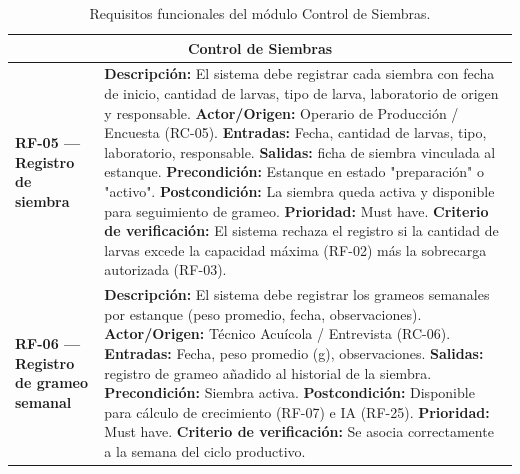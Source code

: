\documentclass[11pt,a4paper]{article}
\begin{document}
\begin{longtable}{|p{3.5cm}|p{12cm}|}

\caption{Requisitos funcionales del módulo Control de Siembras.}
\label{tab:rf-siembras} \\

\hline
\multicolumn{2}{|c|}{\textbf{Control de Siembras}} \\ 
\hline

\textbf{RF-05 — Registro de siembra} &
\textbf{Descripción:} El sistema debe registrar cada siembra con fecha de inicio, cantidad de larvas, tipo de larva, laboratorio de origen y responsable. \newline
\textbf{Actor/Origen:} Operario de Producción / Encuesta (RC-05). \newline
\textbf{Entradas:} Fecha, cantidad de larvas, tipo, laboratorio, responsable. \newline
\textbf{Salidas:} ficha de siembra vinculada al estanque. \newline
\textbf{Precondición:} Estanque en estado "preparación" o "activo". \newline
\textbf{Postcondición:} La siembra queda activa y disponible para seguimiento de grameo. \newline
\textbf{Prioridad:} Must have. \newline
\textbf{Criterio de verificación:} El sistema rechaza el registro si la cantidad de larvas excede la capacidad máxima (RF-02) más la sobrecarga autorizada (RF-03). \\ 
\hline

\textbf{RF-06 — Registro de grameo semanal} &
\textbf{Descripción:} El sistema debe registrar los grameos semanales por estanque (peso promedio, fecha, observaciones). \newline
\textbf{Actor/Origen:} Técnico Acuícola / Entrevista (RC-06). \newline
\textbf{Entradas:} Fecha, peso promedio (g), observaciones. \newline
\textbf{Salidas:} registro de grameo añadido al historial de la siembra. \newline
\textbf{Precondición:} Siembra activa. \newline
\textbf{Postcondición:} Disponible para cálculo de crecimiento (RF-07) e IA (RF-25). \newline
\textbf{Prioridad:} Must have. \newline
\textbf{Criterio de verificación:} Se asocia correctamente a la semana del ciclo productivo. \\ 
\hline


\end{longtable}
\end{document}
